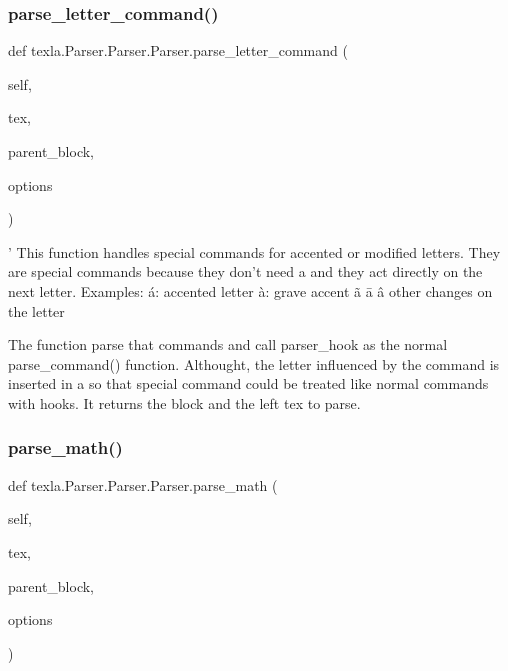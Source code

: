 \subsubsection{\texorpdfstring{parse\+\_\+letter\+\_\+command()}{parse\_letter\_command()}}
{\footnotesize\ttfamily def texla.\+Parser.\+Parser.\+Parser.\+parse\+\_\+letter\+\_\+command (\begin{DoxyParamCaption}\item[{}]{self,  }\item[{}]{tex,  }\item[{}]{parent\+\_\+block,  }\item[{}]{options }\end{DoxyParamCaption})}

\begin{DoxyVerb}'
This function handles special commands for accented
or modified letters.
They are special commands because they don't need a {}
and they act directly on the next letter.
Examples:
\'a: accented letter
\`a: grave accent
\~a \=a \^a other changes on the letter

The function parse that commands and call
parser_hook as the normal parse_command() function.
Althought, the letter influenced by the command is
inserted in a {} so that special command could
be treated like normal commands with hooks.
It returns the block and the left tex to parse.
\end{DoxyVerb}
 \hypertarget{classtexla_1_1Parser_1_1Parser_1_1Parser_aee9adc1fcfa4c8194e37552124f67848}{}\label{classtexla_1_1Parser_1_1Parser_1_1Parser_aee9adc1fcfa4c8194e37552124f67848} 
\subsubsection{\texorpdfstring{parse\+\_\+math()}{parse\_math()}}
{\footnotesize\ttfamily def texla.\+Parser.\+Parser.\+Parser.\+parse\+\_\+math (\begin{DoxyParamCaption}\item[{}]{self,  }\item[{}]{tex,  }\item[{}]{parent\+\_\+block,  }\item[{}]{options }\end{DoxyParamCaption})}

